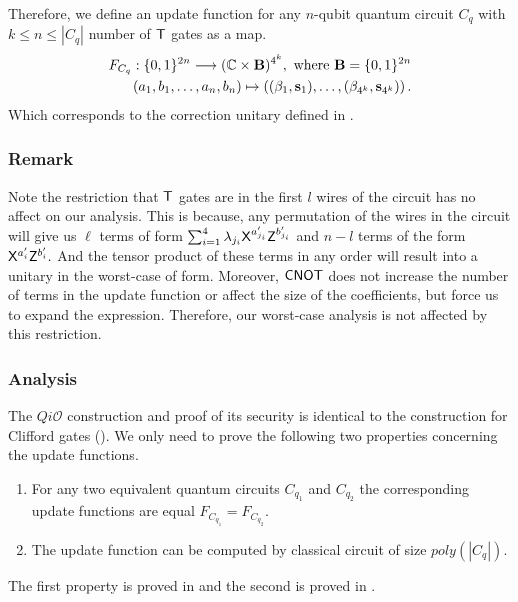 Therefore, we define an update function for any $n$-qubit quantum circuit $C_q$ with $k\leq n\leq |C_q|$ number of ${\sf T}$ gates as a map.
\begin{equation}
\label{nqubit:eq10}
\begin{aligned}
 F_{C_q}:\{0,1\}^{2n}\longrightarrow  (\mathbb{C} \times {\bf B})^{4^k}, \mbox{ where } {\bf B}=\{0,1\}^{2n}\\
  (a_1,b_1,\ldots, a_n,b_n) \mapsto \left((\beta_1, {\bf s}_1),\dots, (\beta_{4^k}, {\bf s}_{4^k})\right).
\end{aligned}
\end{equation}
Which corresponds to the correction unitary defined in .
\subsubsection{Remark}
\label{remark:nqubit-correction1}
Note the restriction that ${\sf T}$ gates are in the first $l$ wires of the circuit has no affect on our analysis. This is because, any permutation of the wires in the circuit will give us $\ell$ terms of form $\sum_{i=1}^4 \lambda_{j_i} {\sf X}^{a_{j_i}^\prime} {\sf Z}^{b_{j_i}^\prime}$ and $n-l$ terms of the form ${\sf X}^{a_{i}^\prime} {\sf Z}^{b_{i}^\prime}.$  And the tensor product of these terms in any order will result into a unitary in the worst-case of form. Moreover, ${\sf CNOT}$ does not increase the number of terms in the update function or affect the size of the coefficients, but force us to expand the expression. Therefore, our worst-case analysis is not affected by this restriction.


\subsubsection{Analysis}
The $Qi\mathcal{O}$ construction and proof of its security is identical to the  construction for Clifford gates (). We only need to prove the following two properties concerning the update functions.
\begin{enumerate}
\item For any two equivalent quantum circuits $C_{q_1}$ and $C_{q_2}$ the corresponding update functions are equal $F_{C_{q_1}}=F_{C_{q_2}}.$
\item The update function can be computed by classical circuit of size $poly(|C_q|).$
\end{enumerate}
The first property is proved in  and the second is proved in . 
%



